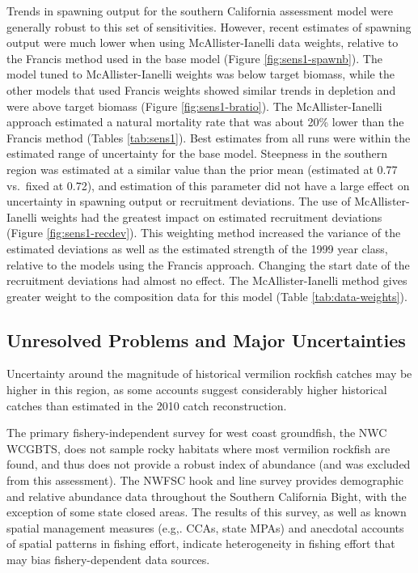\documentclass[11pt,
  english,
  a4paper,
]{article}
\begin{document}
\tagstructend

Trends in spawning output for the southern California assessment model were generally robust to this set of sensitivities. However, recent estimates of spawning output were much lower when using McAllister-Ianelli data weights, relative to the Francis method used in the base model (Figure \ref{fig:sens1-spawnb}). The model tuned to McAllister-Ianelli weights was below target biomass, while the other models that used Francis weights showed similar trends in depletion and were above target biomass (Figure \ref{fig:sens1-bratio}). The McAllister-Ianelli approach estimated a natural mortality rate that was about 20\% lower than the Francis method (Tables \ref{tab:sens1}). Best estimates from all runs were within the estimated range of uncertainty for the base model. Steepness in the southern region was estimated at a similar value than the prior mean (estimated at 0.77 vs.~fixed at 0.72), and estimation of this parameter did not have a large effect on uncertainty in spawning output or recruitment deviations. The use of McAllister-Ianelli weights had the greatest impact on estimated recruitment deviations (Figure \ref{fig:sens1-recdev}). This weighting method increased the variance of the estimated deviations as well as the estimated strength of the 1999 year class, relative to the models using the Francis approach. Changing the start date of the recruitment deviations had almost no effect. The McAllister-Ianelli method gives greater weight to the composition data for this model (Table \ref{tab:data-weights}).


\hypertarget{unresolved-problems-and-major-uncertainties-1}{%
\subsection{Unresolved Problems and Major Uncertainties}\label{unresolved-problems-and-major-uncertainties-1}}

\leavevmode\tagmcend\tagstructend

Uncertainty around the magnitude of historical vermilion rockfish catches may be higher in this region, as some accounts suggest considerably higher historical catches than estimated in the 2010 catch reconstruction.

The primary fishery-independent survey for west coast groundfish, the NWC WCGBTS, does not sample rocky habitats where most vermilion rockfish are found, and thus does not provide a robust index of abundance (and was excluded from this assessment). The NWFSC hook and line survey provides demographic and relative abundance data throughout the Southern California Bight, with the exception of some state closed areas. The results of this survey, as well as known spatial management measures (e.g,. CCAs, state MPAs) and anecdotal accounts of spatial patterns in fishing effort, indicate heterogeneity in fishing effort that may bias fishery-dependent data sources.
\end{document}
